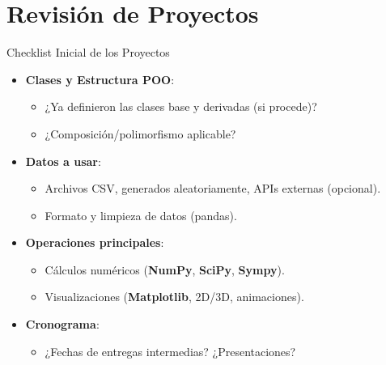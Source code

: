 \documentclass[10pt]{beamer}
\begin{document}
\section{Revisión de Proyectos}

\begin{frame}{Checklist Inicial de los Proyectos}
  \begin{itemize}
    \item \textbf{Clases y Estructura POO}: 
      \begin{itemize}
        \item ¿Ya definieron las clases base y derivadas (si procede)?
        \item ¿Composición/polimorfismo aplicable?
      \end{itemize}
    \item \textbf{Datos a usar}:
      \begin{itemize}
        \item Archivos CSV, generados aleatoriamente, APIs externas (opcional).
        \item Formato y limpieza de datos (pandas).
      \end{itemize}
    \item \textbf{Operaciones principales}:
      \begin{itemize}
        \item Cálculos numéricos (\textbf{NumPy}, \textbf{SciPy}, \textbf{Sympy}).
        \item Visualizaciones (\textbf{Matplotlib}, 2D/3D, animaciones).
      \end{itemize}
    \item \textbf{Cronograma}:
      \begin{itemize}
        \item ¿Fechas de entregas intermedias? ¿Presentaciones?
      \end{itemize}
  \end{itemize}
\end{frame}
\end{document}
